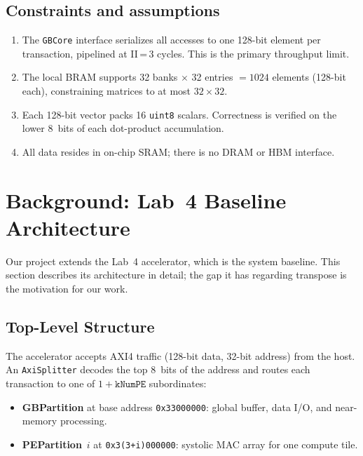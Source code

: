 \documentclass[11pt]{article}
\begin{document}
\subsection{Constraints and assumptions}
\begin{enumerate}[nosep]
  \item The \texttt{GBCore} interface serializes all accesses to one 128-bit element per transaction, pipelined at II\,=\,3 cycles. This is the primary throughput limit.
  \item The local BRAM supports 32 banks $\times$ 32 entries $= 1024$ elements (128-bit each), constraining matrices to at most $32\!\times\!32$.
  \item Each 128-bit vector packs 16 \texttt{uint8} scalars. Correctness is verified on the lower 8~bits of each dot-product accumulation.
  \item All data resides in on-chip SRAM; there is no DRAM or HBM interface.
\end{enumerate}


\section{Background: Lab~4 Baseline Architecture}

Our project extends the Lab~4 accelerator, which is the system baseline. This
section describes its architecture in detail; the gap it has regarding
transpose is the motivation for our work.

\subsection{Top-Level Structure}

The accelerator accepts AXI4 traffic (128-bit data, 32-bit address) from the
host. An \texttt{AxiSplitter} decodes the top 8~bits of the address and routes each transaction to one of $1 + \texttt{kNumPE}$ subordinates:

\begin{itemize}[nosep]
  \item \textbf{GBPartition} at base address \texttt{0x33000000}: global
        buffer, data I/O, and near-memory processing.
  \item \textbf{PEPartition}~$i$ at \texttt{0x3(3+i)000000}: systolic MAC
        array for one compute tile.
\end{itemize}
\end{document}
